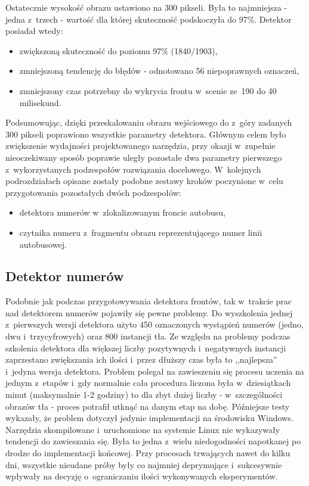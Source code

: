 Ostatecznie wysokość obrazu ustawiono na 300 pikseli. Była to najmniejsza - jedna
z~trzech - wartość dla której skuteczność podskoczyła do 97\%.
Detektor posiadał wtedy:
\begin{itemize}
	\item zwiększoną skuteczność do poziomu 97\% (1840/1903),
	\item zmniejszoną tendencję do błędów - odnotowano 56 niepoprawnych oznaczeń,
	\item zmniejszony czas potrzebny do wykrycia frontu w~scenie 
	ze~190 do 40 milisekund.
\end{itemize}

Podsumowując, dzięki przeskalowaniu obrazu wejściowego do z~góry zadanych
300 pikseli poprawiono wszystkie parametry detektora. 
Głównym celem było zwiększenie wydajności projektowanego narzędzia, przy
okazji w~zupełnie nieoczekiwany sposób poprawie uległy pozostałe dwa parametry
pierwszego z~wykorzystanych podzespołów rozwiązania docelowego.
W~kolejnych podrozdziałach opisane zostały podobne zestawy kroków
poczynione w~celu przygotowania pozostałych dwóch podzespołów:

\begin{itemize}
	\item detektora numerów w~zlokalizowanym froncie autobusu,
	\item czytnika numeru z~fragmentu obrazu reprezentującego numer linii autobusowej.
\end{itemize}

\subsection{Detektor numerów}

Podobnie jak podczas przygotowywania detektora frontów,
tak w~trakcie prac nad detektorem numerów pojawiły się pewne problemy.
Do wyszkolenia jednej z~pierwszych wersji
detektora użyto 450 oznaczonych wystąpień numerów (jedno, dwu
i~trzycyfrowych) oraz 800 instancji tła. Ze względu na problemy podczas
szkolenia detektora dla większej liczby pozytywnych i~negatywnych 
instancji zaprzestano zwiększania ich ilości i~przez dłuższy czas
była to ,,najlepsza'' i~jedyna wersja detektora. Problem polegał na
zawieszeniu się procesu uczenia na jednym z~etapów i~gdy normalnie 
cała procedura liczona była w~dziesiątkach minut (maksymalnie 1-2 godziny)
to dla zbyt dużej liczby - w~szczególności obrazów tła - proces potrafił
utknąć na danym etap na dobę. Późniejsze testy wykazały, że
problem dotyczył jedynie implementacji na środowisku Windows. 
Narzędzia skompilowane i~uruchomione na systemie Linux nie 
wykazywały tendencji do zawieszania się. Była to jedna z~wielu 
niedogodności napotkanej po drodze do implementacji końcowej. 
Przy procesach trwających nawet do kilku dni, wszystkie nieudane próby
były co najmniej deprymujące i~sukcesywnie wpływały na decyzję
o~ograniczaniu ilości wykonywanych eksperymentów.


